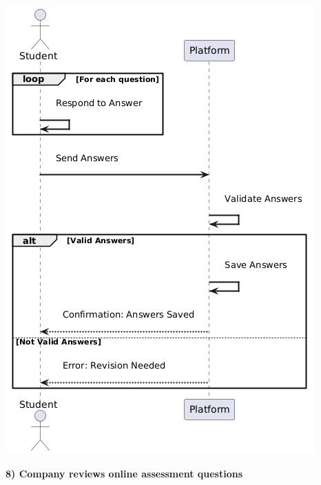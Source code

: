 \begin{center}
    \includegraphics[scale = 0.8]{Images/ImagesRASD/Student_sending_answers.png}
\end{center}

\newpage
\textbf{8) Company reviews online assessment questions}\\


